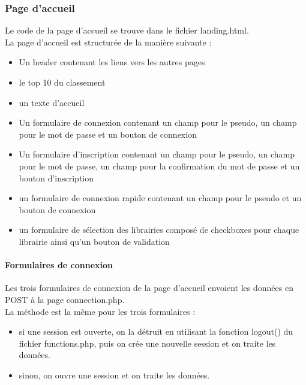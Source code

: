 \documentclass[12pt, openany]{article}
\begin{document}
	\subsubsection{Page d'accueil}
	Le code de la page d'accueil se trouve dans le fichier landing.html.\\
	La page d'accueil est structurée de la manière suivante :
	\begin{itemize}[label=$-$]
		\item Un header contenant les liens vers les autres pages\\
		\item le top 10 du classement\\
		\item un texte d'accueil\\
		\item Un formulaire de connexion contenant un champ pour le pseudo, un champ pour le mot de passe et un bouton de connexion\\
		\item Un formulaire d'inscription contenant un champ pour le pseudo, un champ pour le mot de passe, un champ pour la confirmation du mot de passe et un bouton d'inscription\\
		\item un formulaire de connexion rapide contenant un champ pour le pseudo et un bouton de connexion\\
		\item un formulaire de sélection des librairies composé de checkboxes pour chaque librairie ainsi qu'un bouton de validation\\
	\end{itemize}

	\paragraph{Formulaires de connexion}
	Les trois formulaires de connexion de la page d'accueil envoient les données en POST à la page connection.php.\\
	La méthode est la même pour les trois formulaires :\\
	\begin{itemize}[label=$-$]
		\item si une session est ouverte, on la détruit en utilisant la fonction logout() du fichier functions.php, puis on crée une nouvelle session et on traite les données.\\
		\item sinon, on ouvre une session et on traite les données.\\
	\end{itemize}
\end{document}
